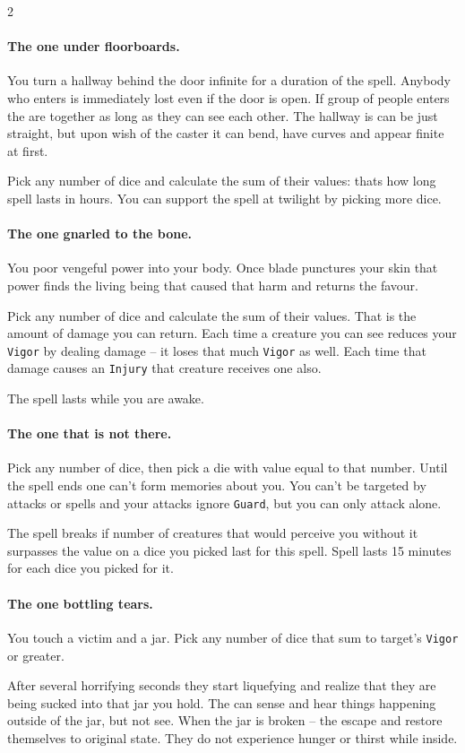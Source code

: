 \begin{multicols*}{2}
\paragraph{The one under floorboards.} You turn a hallway behind the door infinite for a duration of the spell. 
Anybody who enters is immediately lost even if the door is open. If group of people enters the are together as long as they can see each other. 
The hallway is can be just straight, but upon wish of the caster it can bend, have curves and appear finite at first. 

Pick any number of dice and calculate the sum of their values: thats how long spell lasts in hours. 
You can support the spell at twilight by picking more dice.

\paragraph{The one gnarled to the bone.} You poor vengeful power into your body. 
Once blade punctures your skin that power finds the living being that caused that harm and returns the favour.

Pick any number of dice and calculate the sum of their values. That is the amount of damage you can return. 
Each time a creature you can see reduces your \texttt{Vigor} by dealing damage -- it loses that much \texttt{Vigor} as well.
Each time that damage causes an \texttt{Injury} that creature receives one also.

The spell lasts while you are awake. 

\paragraph{The one that is not there.} Pick any number of dice, then pick a die with value equal to that number. 
Until the spell ends one can't form memories about you. 
You can't be targeted by attacks or spells and your attacks ignore \texttt{Guard}, but you can only attack alone.

The spell breaks if number of creatures that would perceive you without it surpasses the value on a dice you picked last for this spell. 
Spell lasts 15 minutes for each dice you picked for it.

\paragraph{The one bottling tears.} You touch a victim and a jar. Pick any number of dice that sum to target's \texttt{Vigor} or greater. 

After several horrifying seconds they start liquefying and realize that they are being sucked into that jar you hold.
The can sense and hear things happening outside of the jar, but not see. When the jar is broken -- the escape and restore themselves to original state. 
They do not experience hunger or thirst while inside.


\end{multicols*}
